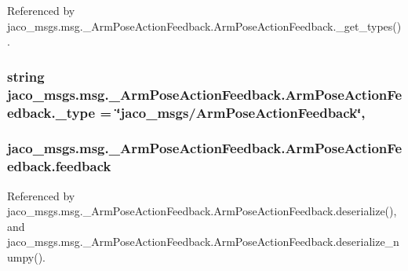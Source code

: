 Referenced by jaco\+\_\+msgs.\+msg.\+\_\+\+Arm\+Pose\+Action\+Feedback.\+Arm\+Pose\+Action\+Feedback.\+\_\+get\+\_\+types().

\subsubsection[{\texorpdfstring{\+\_\+type}{_type}}]{\setlength{\rightskip}{0pt plus 5cm}string jaco\+\_\+msgs.\+msg.\+\_\+\+Arm\+Pose\+Action\+Feedback.\+Arm\+Pose\+Action\+Feedback.\+\_\+type = \char`\"{}jaco\+\_\+msgs/{\bf Arm\+Pose\+Action\+Feedback}\char`\"{}\hspace{0.3cm}{\ttfamily [static]}, {\ttfamily [private]}}\hypertarget{classjaco__msgs_1_1msg_1_1__ArmPoseActionFeedback_1_1ArmPoseActionFeedback_a396826cb9907ef9f3b8a37233a705f67}{}\label{classjaco__msgs_1_1msg_1_1__ArmPoseActionFeedback_1_1ArmPoseActionFeedback_a396826cb9907ef9f3b8a37233a705f67}
\subsubsection[{\texorpdfstring{feedback}{feedback}}]{\setlength{\rightskip}{0pt plus 5cm}jaco\+\_\+msgs.\+msg.\+\_\+\+Arm\+Pose\+Action\+Feedback.\+Arm\+Pose\+Action\+Feedback.\+feedback}\hypertarget{classjaco__msgs_1_1msg_1_1__ArmPoseActionFeedback_1_1ArmPoseActionFeedback_a3c9079d060107fb271e00b9cc073b42c}{}\label{classjaco__msgs_1_1msg_1_1__ArmPoseActionFeedback_1_1ArmPoseActionFeedback_a3c9079d060107fb271e00b9cc073b42c}


Referenced by jaco\+\_\+msgs.\+msg.\+\_\+\+Arm\+Pose\+Action\+Feedback.\+Arm\+Pose\+Action\+Feedback.\+deserialize(), and jaco\+\_\+msgs.\+msg.\+\_\+\+Arm\+Pose\+Action\+Feedback.\+Arm\+Pose\+Action\+Feedback.\+deserialize\+\_\+numpy().

